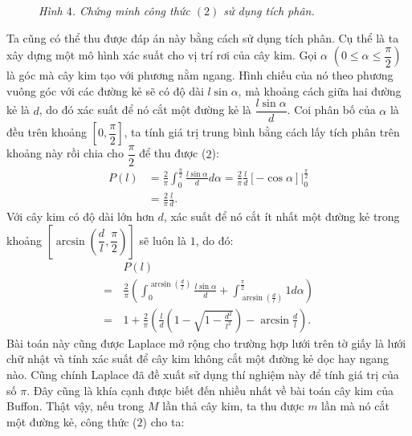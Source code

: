 \begin{multicols}{2}
\begin{figure}[H]
		\caption{\small\textit{\color{toanhocdoisong}Hình $4$. Chứng minh công thức $(2)$ sử dụng tích phân.}}
		\vspace*{-10pt}
	\end{figure}
	Ta cũng có thể thu được đáp án này bằng cách sử dụng tích phân. Cụ thể là ta xây dựng một mô hình xác suất cho vị trí rơi của cây kim. Gọi $\alpha$ $(0\le \alpha \le \dfrac{\pi}{2})$ là góc mà cây kim tạo với phương nằm ngang. Hình chiếu của nó theo phương vuông góc với các đường kẻ sẽ có độ dài $l\sin\alpha$, mà khoảng cách giữa hai đường kẻ là $d$, do đó xác suất để nó cắt một đường kẻ là $\dfrac{l\sin\alpha}{d}$. Coi phân bố của $\alpha$ là đều trên khoảng $[0,\dfrac{\pi}{2}]$, ta tính giá trị trung bình bằng cách lấy tích phân trên khoảng này rồi chia cho $\dfrac{\pi}{2}$ để thu được ($2$):
	\begin{align*}
		P(l) &= \frac{2}{\pi }\int_0^{\frac{\pi }{2}} {\frac{{l\sin \alpha }}{d}} d\alpha  = \frac{2}{\pi }\frac{l}{d}\left[ { - \cos \alpha } \right]|_0^{\frac{\pi }{2}}\\
		& = \frac{2}{\pi }\frac{l}{d}.
	\end{align*}
	Với cây kim có độ dài lớn hơn $d$, xác suất để nó cắt ít nhất một đường kẻ trong khoảng $\left[\arcsin\left(\dfrac{d}{l}, \dfrac{\pi}{2}\right)\right]$ sẽ luôn là $1$, do đó:
	\begin{align*}
		&P(l) \\
		= \,&\frac{2}{\pi }\left( {\int_0^{\arcsin \left( {\frac{d}{l}} \right)} {\frac{{l\sin \alpha }}{d} + } \int_{\arcsin \left( {\frac{d}{l}} \right)}^{\frac{\pi }{2}} {1d\alpha } } \right)\\
		=\,&1 \!\!+\!\! \frac{2}{\pi }\!\left( \!\!{\frac{l}{d}\!\!\left(\!\! {1 \!-\! \sqrt {\!\!1 \!-\! \frac{{{d^2}}}{{{l^2}}}} \!} \right) \!\!-\! \arcsin\! \frac{d}{l}}\! \right)\!\!.\tag{$3$}
	\end{align*}
	Bài toán này cũng được Laplace mở rộng cho trường hợp lưới trên tờ giấy là lưới chữ nhật và  tính xác suất để cây kim không cắt một đường kẻ dọc hay ngang nào. 
	\vskip 0.1cm
	Cũng chính Laplace đã đề xuất sử dụng thí nghiệm này để tính giá trị của số $\pi$. Đây cũng là khía cạnh được biết đến nhiều nhất về bài toán cây kim của Buffon. Thật vậy, nếu trong $M$ lần thả cây kim, ta thu được $m$ lần mà nó cắt một đường kẻ, công thức ($2$) cho ta:
	\begin{align*}

\end{align*}
\end{multicols}
